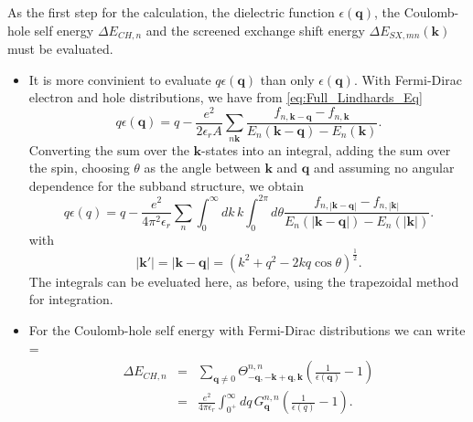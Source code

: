 As the first step for the calculation, the dielectric function $\epsilon(\mathbf{q})$,
the Coulomb-hole self energy $\Delta E_{CH,n}$ and the screened exchange
shift energy $\Delta E_{SX,mn}(\mathbf{k})$ must be evaluated. 
\begin{itemize}
\item It is more convinient to evaluate $q\epsilon(\mathbf{q})$ than only
$\epsilon(\mathbf{q})$. With Fermi-Dirac electron and hole distributions,
we have from \ref{eq:Full_Lindhards_Eq} \begin{equation}
q\epsilon(\mathbf{q})=q-\frac{e^{2}}{2\epsilon_{r}A}\sum_{n\mathbf{k}}\frac{f_{n,\mathbf{k}-\mathbf{q}}-f_{n,\mathbf{k}}}{E_{n}(\mathbf{k}-\mathbf{q})-E_{n}(\mathbf{k})}.\end{equation}
Converting the sum over the $\mathbf{k}$-states into an integral,
adding the sum over the spin, choosing $\theta$ as the angle between
$\mathbf{k}$ and $\mathbf{q}$ and assuming no angular dependence
for the subband structure, we obtain\begin{equation}
q\epsilon(q)=q-\frac{e^{2}}{4\pi^{2}\epsilon_{r}}\sum_{n}\int_{0}^{\infty}dk\, k\int_{0}^{2\pi}d\theta\frac{f_{n,\left|\mathbf{k}-\mathbf{q}\right|}-f_{n,\mathbf{\left|k\right|}}}{E_{n}\left(\left|\mathbf{k}-\mathbf{q}\right|\right)-E_{n}(\mathbf{\left|k\right|})}.\end{equation}
with \begin{equation}
\left|\mathbf{k}'\right|=\left|\mathbf{k}-\mathbf{q}\right|=\left(k^{2}+q^{2}-2kq\cos\theta\right)^{\frac{1}{2}}.\end{equation}
The integrals can be eveluated here, as before, using the trapezoidal
method for integration. 
\item For the Coulomb-hole self energy with Fermi-Dirac distributions we
can write =\begin{eqnarray}
\Delta E_{CH,n} & = & \sum_{\mathbf{q}\neq0}\Theta_{-\mathbf{q},-\mathbf{k}+\mathbf{q},\mathbf{k}}^{n,n}\left(\frac{1}{\epsilon(\mathbf{q})}-1\right)\nonumber \\
 & = & \frac{e^{2}}{4\pi\epsilon_{r}}\int_{0^{+}}^{\infty}dq\, G_{\mathbf{q}}^{n,n}\left(\frac{1}{\epsilon(q)}-1\right).\end{eqnarray}


\end{itemize}
